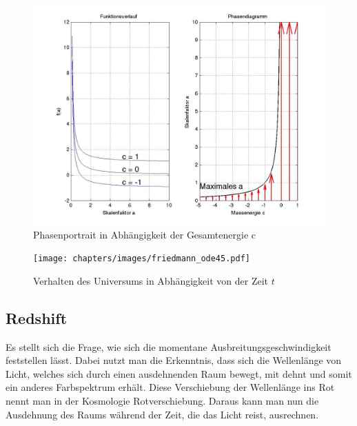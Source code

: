 \begin{refsection}
\begin{figure}
	\centering
	\includegraphics[width  = \textwidth]{chapters/images/phasendiagramm.jpg}
	\caption{Phasenportrait in Abhängigkeit der Gesamtenergie c
		\label{friedmann:phasenportrait}}
\end{figure}%


\begin{figure}
	\centering
	\texttt{[image: chapters/images/friedmann\_ode45.pdf]}
	\caption{Verhalten des Universums in Abhängigkeit von der Zeit $t$
		\label{friedmann:friedmannGleichung}}
\end{figure}%

\subsection{Redshift}
Es stellt sich die Frage, wie sich die momentane Ausbreitungsgeschwindigkeit feststellen lässt. Dabei nutzt man die Erkenntnis, dass sich die Wellenlänge von Licht, welches sich durch einen ausdehnenden Raum bewegt, mit dehnt und somit ein anderes Farbspektrum erhält. Diese Verschiebung der Wellenlänge ins Rot nennt man in der Kosmologie Rotverschiebung. Daraus kann man nun die Ausdehnung des Raums während der Zeit, die das Licht reist, ausrechnen.
	
	

\end{refsection}
